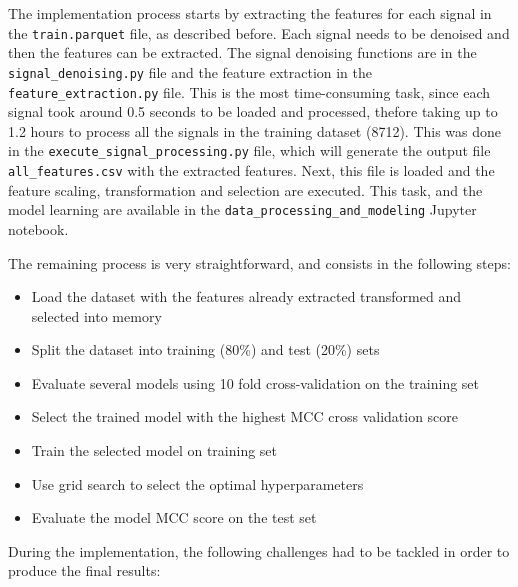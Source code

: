 \documentclass[11pt]{article}
\begin{document}
The implementation process starts by extracting the features for each
signal in the \texttt{train.parquet} file, as described before. Each
signal needs to be denoised and then the features can be extracted. The
signal denoising functions are in the \texttt{signal\_denoising.py} file
and the feature extraction in the \texttt{feature\_extraction.py} file.
This is the most time-consuming task, since each signal took around 0.5
seconds to be loaded and processed, thefore taking up to 1.2 hours to
process all the signals in the training dataset (8712). This was done in
the \texttt{execute\_signal\_processing.py} file, which will generate
the output file \texttt{all\_features.csv} with the extracted features.
Next, this file is loaded and the feature scaling, transformation and
selection are executed. This task, and the model learning are available
in the \texttt{data\_processing\_and\_modeling} Jupyter notebook.

The remaining process is very straightforward, and consists in the
following steps:

\begin{itemize}
	\item
	Load the dataset with the features already extracted
	transformed and selected into memory
	\item
	Split the dataset into training
	(80\%) and test (20\%) sets 
	\item
	Evaluate several models using 10 fold
	cross-validation on the training set
	\item
	Select the trained model with the
	highest MCC cross validation score
	\item 
	Train the selected model on
	training set
	\item 
	Use grid search to select the optimal
	hyperparameters
	\item 
	Evaluate the model MCC score on the test set
	
\end{itemize}

During the implementation, the following challenges had to be tackled in order to produce the final results:
\end{document}
